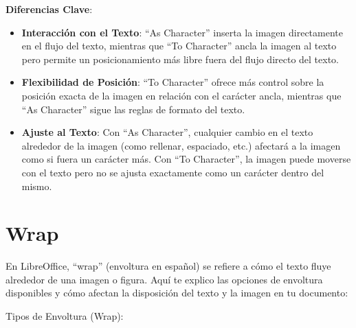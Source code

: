 \documentclass[
  jou,
  floatsintext,
  longtable,
  a4paper,
  nolmodern,
  notxfonts,
  notimes,
  12pt,
  colorlinks=true,linkcolor=blue,citecolor=blue,urlcolor=blue]{apa7}
\begin{document}
\textbf{Diferencias Clave}:

\begin{itemize}
\item
  \textbf{Interacción con el Texto}: ``As Character'' inserta la imagen
  directamente en el flujo del texto, mientras que ``To Character''
  ancla la imagen al texto pero permite un posicionamiento más libre
  fuera del flujo directo del texto.
\item
  \textbf{Flexibilidad de Posición}: ``To Character'' ofrece más control
  sobre la posición exacta de la imagen en relación con el carácter
  ancla, mientras que ``As Character'' sigue las reglas de formato del
  texto.
\item
  \textbf{Ajuste al Texto}: Con ``As Character'', cualquier cambio en el
  texto alrededor de la imagen (como rellenar, espaciado, etc.) afectará
  a la imagen como si fuera un carácter más. Con ``To Character'', la
  imagen puede moverse con el texto pero no se ajusta exactamente como
  un carácter dentro del mismo.
\end{itemize}

\section{Wrap}\label{wrap}

En LibreOffice, ``wrap'' (envoltura en español) se refiere a cómo el
texto fluye alrededor de una imagen o figura. Aquí te explico las
opciones de envoltura disponibles y cómo afectan la disposición del
texto y la imagen en tu documento:

Tipos de Envoltura (Wrap):
\end{document}
